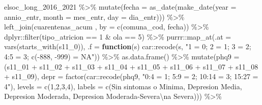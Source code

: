 \documentclass[
  12pt,
]{book}
\newenvironment{Shaded}{\begin{snugshade}}{\end{snugshade}}
\newcommand{\AttributeTok}[1]{\textcolor[rgb]{0.77,0.63,0.00}{#1}}
\newcommand{\ControlFlowTok}[1]{\textcolor[rgb]{0.13,0.29,0.53}{\textbf{#1}}}
\newcommand{\DecValTok}[1]{\textcolor[rgb]{0.00,0.00,0.81}{#1}}
\newcommand{\FunctionTok}[1]{\textcolor[rgb]{0.00,0.00,0.00}{#1}}
\newcommand{\NormalTok}[1]{#1}
\newcommand{\SpecialCharTok}[1]{\textcolor[rgb]{0.00,0.00,0.00}{#1}}
\newcommand{\StringTok}[1]{\textcolor[rgb]{0.31,0.60,0.02}{#1}}
\begin{document}
\begin{Shaded}
\begin{Highlighting}[]
\NormalTok{elsoc\_long\_2016\_2021 }\SpecialCharTok{\%\textgreater{}\%} 
  \FunctionTok{mutate}\NormalTok{(}\AttributeTok{fecha =} \FunctionTok{as\_date}\NormalTok{(}\FunctionTok{make\_date}\NormalTok{(}\AttributeTok{year =}\NormalTok{ annio\_entr, }\AttributeTok{month =}\NormalTok{ mes\_entr, }\AttributeTok{day =}\NormalTok{ dia\_entr))) }\SpecialCharTok{\%\textgreater{}\%} 
  \FunctionTok{left\_join}\NormalTok{(cuarentenas\_acum , }\AttributeTok{by =} \FunctionTok{c}\NormalTok{(}\StringTok{\textquotesingle{}comuna\_cod\textquotesingle{}}\NormalTok{, }\StringTok{\textquotesingle{}fecha\textquotesingle{}}\NormalTok{)) }\SpecialCharTok{\%\textgreater{}\%} 
\NormalTok{  dplyr}\SpecialCharTok{::}\FunctionTok{filter}\NormalTok{(tipo\_atricion }\SpecialCharTok{==} \DecValTok{1} \SpecialCharTok{\&}\NormalTok{ ola }\SpecialCharTok{==} \DecValTok{5}\NormalTok{) }\SpecialCharTok{\%\textgreater{}\%} 
\NormalTok{    purrr}\SpecialCharTok{::}\FunctionTok{map\_at}\NormalTok{(}\AttributeTok{.at =} \FunctionTok{vars}\NormalTok{(}\FunctionTok{starts\_with}\NormalTok{(}\StringTok{\textquotesingle{}s11\_0\textquotesingle{}}\NormalTok{)), }
                \AttributeTok{.f =} \ControlFlowTok{function}\NormalTok{(s) car}\SpecialCharTok{::}\FunctionTok{recode}\NormalTok{(s, }\StringTok{"1 = 0; 2 = 1; 3 = 2; 4:5 = 3; c({-}888, {-}999) = NA"}\NormalTok{)) }\SpecialCharTok{\%\textgreater{}\%}
  \FunctionTok{as.data.frame}\NormalTok{() }\SpecialCharTok{\%\textgreater{}\%}  
  \FunctionTok{mutate}\NormalTok{(}\AttributeTok{phq9 =}\NormalTok{ (s11\_01 }\SpecialCharTok{+}\NormalTok{ s11\_02 }\SpecialCharTok{+}\NormalTok{ s11\_03 }\SpecialCharTok{+}\NormalTok{ s11\_04 }\SpecialCharTok{+}\NormalTok{ s11\_05 }\SpecialCharTok{+}\NormalTok{ s11\_06 }\SpecialCharTok{+}\NormalTok{ s11\_07 }\SpecialCharTok{+}\NormalTok{ s11\_08 }\SpecialCharTok{+}\NormalTok{ s11\_09),}
         \AttributeTok{depr =} \FunctionTok{factor}\NormalTok{(car}\SpecialCharTok{::}\FunctionTok{recode}\NormalTok{(phq9, }\StringTok{"0:4 = 1; 5:9 = 2; 10:14 = 3; 15:27 = 4"}\NormalTok{), }
                       \AttributeTok{levels =} \FunctionTok{c}\NormalTok{(}\DecValTok{1}\NormalTok{,}\DecValTok{2}\NormalTok{,}\DecValTok{3}\NormalTok{,}\DecValTok{4}\NormalTok{),}
                       \AttributeTok{labels =} \FunctionTok{c}\NormalTok{(}\StringTok{\textquotesingle{}Sin sintomas o Minima\textquotesingle{}}\NormalTok{, }\StringTok{\textquotesingle{}Depresion Media\textquotesingle{}}\NormalTok{, }\StringTok{\textquotesingle{}Depresion Moderada\textquotesingle{}}\NormalTok{, }\StringTok{\textquotesingle{}Depresion Moderada{-}Severa}\SpecialCharTok{\textbackslash{}n}\StringTok{a Severa\textquotesingle{}}\NormalTok{))) }\SpecialCharTok{\%\textgreater{}\%}  

\end{Highlighting}
\end{Shaded}
\end{document}
